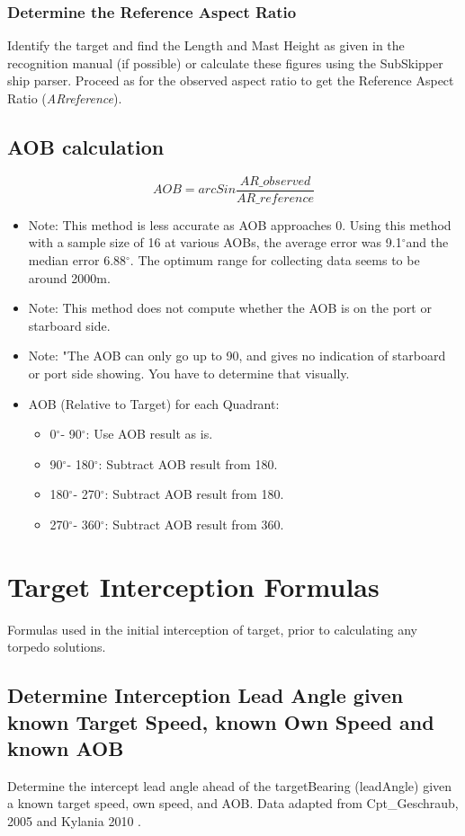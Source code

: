 \documentclass{article}
\newcommand{\degree}{$^{\circ}$}
\begin{document}
\subsubsection{Determine the Reference Aspect Ratio}
Identify the target and find the Length and Mast Height as given in the recognition manual (if possible) or calculate these figures using the SubSkipper ship parser. Proceed as for the observed aspect ratio to get the Reference Aspect Ratio (\emph{ARreference}).

\subsection{AOB calculation}
$$AOB = arcSin \frac{AR\_{observed}}{AR\_{reference}}$$

\begin{itemize}
\item{Note: This method is less accurate as AOB approaches 0. Using this method with a sample size of 16 at various AOBs, the average error was 9.1\degree and the median error 6.88\degree. The optimum range for collecting data seems to be around 2000m.}
\item{Note: This method does not compute whether the AOB is on the port or starboard side.}
\item{Note: "The AOB can only go up to 90, and gives no indication of starboard or port side showing. You have to determine that visually.}

\item{
AOB (Relative to Target) for each Quadrant:
	\begin{itemize}
	\item{0\degree - 90\degree : Use AOB result as is.}
	\item{90\degree - 180\degree : Subtract AOB result from 180.}
	\item{180\degree - 270\degree : Subtract AOB result from 180.}
	\item{270\degree - 360\degree : Subtract AOB result from 360.}
	\end{itemize}
}
\end{itemize}

\section{Target Interception Formulas}
Formulas used in the initial interception of target, prior to calculating any torpedo solutions.

\subsection{Determine Interception Lead Angle given known Target Speed, known Own Speed and known AOB}
Determine the intercept lead angle ahead of the targetBearing (leadAngle) given a known target speed, own speed, and AOB. Data adapted from  Cpt\_Geschraub, 2005\cite{ubiIntercept} and Kylania 2010 \cite{ssIntercept}.
\end{document}
